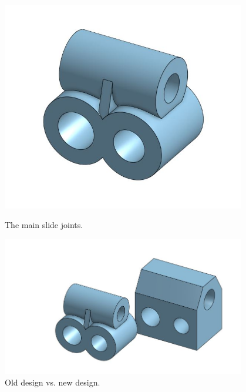 \begin{figure}[ht]
\centering
\begin{minipage}[b]{.48\textwidth}
  \centering
  \includegraphics[width=0.95\textwidth]{Meetings/October/10-29-21/10-29-21_CAD_Figure1 - Nathan Forrer.JPG}
  \caption{The main slide joints.}
  \label{fig:pic3}
\end{minipage}%
\hfill%
\begin{minipage}[b]{.48\textwidth}
  \centering
  \includegraphics[width=0.95\textwidth]{Meetings/October/10-29-21/10-29-21_CAD_Figure2 - Nathan Forrer.JPG}
  \caption{Old design vs. new design.}
  \label{fig:pic4}
\end{minipage}
\end{figure}

